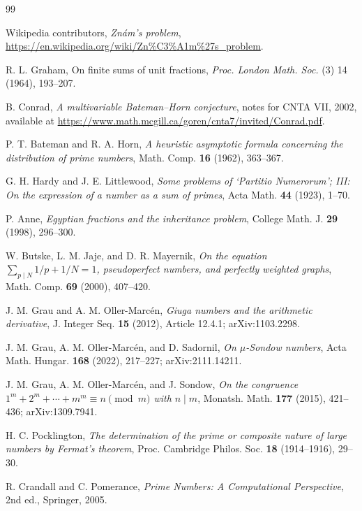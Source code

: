 \documentclass[11pt]{amsart}
\theoremstyle{plain}
\theoremstyle{definition}
\theoremstyle{remark}
\begin{document}
\begin{thebibliography}{99}



Wikipedia contributors,
\emph{Zn\'am's problem},
\url{https://en.wikipedia.org/wiki/Zn%C3%A1m%27s_problem}.

R. L. Graham,
On finite sums of unit fractions,
\emph{Proc. London Math. Soc.} (3) 14 (1964), 193--207.

B. Conrad, \emph{A multivariable Bateman--Horn conjecture}, notes for CNTA VII, 2002, available at \url{https://www.math.mcgill.ca/goren/cnta7/invited/Conrad.pdf}.

P. T. Bateman and R. A. Horn, \emph{A heuristic asymptotic formula concerning the distribution of prime numbers}, Math. Comp. \textbf{16} (1962), 363--367.

G. H. Hardy and J. E. Littlewood, \emph{Some problems of `Partitio Numerorum'; III: On the expression of a number as a sum of primes}, Acta Math. \textbf{44} (1923), 1--70.

P. Anne, \emph{Egyptian fractions and the inheritance problem}, College Math. J. \textbf{29} (1998), 296--300.

W. Butske, L. M. Jaje, and D. R. Mayernik, \emph{On the equation $\sum_{p\mid N}1/p+1/N=1$, pseudoperfect numbers, and perfectly weighted graphs}, Math. Comp. \textbf{69} (2000), 407--420.

J. M. Grau and A. M. Oller-Marc\'en, \emph{Giuga numbers and the arithmetic derivative}, J. Integer Seq. \textbf{15} (2012), Article 12.4.1; arXiv:1103.2298.

J. M. Grau, A. M. Oller-Marc\'en, and D. Sadornil, \emph{On $\mu$-Sondow numbers}, Acta Math. Hungar. \textbf{168} (2022), 217--227; arXiv:2111.14211.

J. M. Grau, A. M. Oller-Marc\'en, and J. Sondow, \emph{On the congruence $1^m+2^m+\cdots+m^m\equiv n \pmod{m}$ with $n\mid m$}, Monatsh. Math. \textbf{177} (2015), 421--436; arXiv:1309.7941.

H. C. Pocklington, \emph{The determination of the prime or composite nature of large numbers by Fermat's theorem}, Proc. Cambridge Philos. Soc. \textbf{18} (1914--1916), 29--30.

R. Crandall and C. Pomerance, \emph{Prime Numbers: A Computational Perspective}, 2nd ed., Springer, 2005.


\end{thebibliography}
\end{document}
